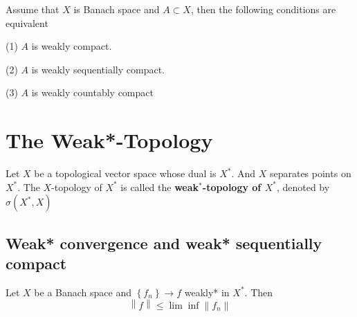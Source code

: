 \documentclass[12pt, oneside]{book}
\begin{document}
\begin{theorem}
    Assume that $X$ is Banach space and $A\subset X$, then the following conditions are equivalent

    (1) $A$ is weakly compact.

    (2) $A$ is weakly sequentially compact.

    (3) $A$ is weakly countably compact
\end{theorem}







\newpage
\section{The Weak*-Topology}
\begin{definition}
    Let $X$ be a topological vector space whose dual is $X^*$. And $X$ separates points on $X^*$.
    The $X$-topology of $X^*$ is called the \textbf{weak$^*$-topology of $X^*$}, denoted by $\sigma\left(X^*,X\right)$
\end{definition}




\subsection{Weak* convergence and weak* sequentially compact}

\begin{theorem}
    Let $X$ be a Banach space and $\left\{f_n\right\} \to f$ weakly* in $X^*$.
    Then
    \begin{equation*}
        \left\|f\right\|
        \leq
        \lim\inf \left\|f_n\right\|
    \end{equation*}
\end{theorem}
\end{document}
